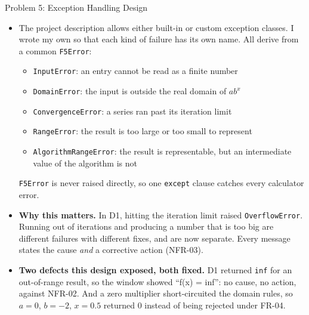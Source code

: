 \documentclass[11pt]{beamer}
\begin{document}
\begin{frame}{Problem 5: Exception Handling Design}
  \footnotesize
  \begin{itemize}
    \item The project description allows either built-in or custom exception
          classes. I wrote my own so that each kind of failure has its own
          name. All derive from a common \texttt{F5Error}:
    \begin{itemize}
      \item \texttt{InputError}: an entry cannot be read as a finite number
      \item \texttt{DomainError}: the input is outside the real domain of $ab^{x}$
      \item \texttt{ConvergenceError}: a series ran past its iteration limit
      \item \texttt{RangeError}: the result is too large or too small to represent
      \item \texttt{AlgorithmRangeError}: the result is representable, but an
            intermediate value of the algorithm is not
    \end{itemize}
    \texttt{F5Error} is never raised directly, so one \texttt{except} clause
    catches every calculator error.
    \item \textbf{Why this matters.} In D1, hitting the iteration limit raised
          \texttt{OverflowError}. Running out of iterations and producing a
          number that is too big are different failures with different fixes,
          and are now separate. Every message states the cause \emph{and} a
          corrective action (NFR-03).
    \item \textbf{Two defects this design exposed, both fixed.} D1 returned
          \texttt{inf} for an out-of-range result, so the window showed
          ``f(x) = inf'': no cause, no action, against NFR-02. And a zero
          multiplier short-circuited the domain rules, so $a = 0$, $b = -2$,
          $x = 0.5$ returned $0$ instead of being rejected under FR-04.
  \end{itemize}
\end{frame}
\end{document}
